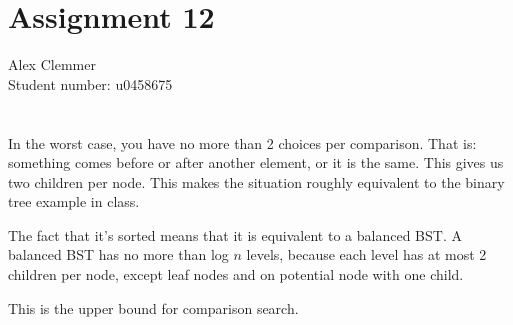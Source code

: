 \documentclass[a4paper]{article}
\begin{document}
\section*{Assignment 12}
Alex Clemmer\\
Student number: u0458675

\section{}

In the worst case, you have no more than 2 choices per comparison. That is: something comes before or after another element, or it is the same. This gives us two children per node. This makes the situation roughly equivalent to the binary tree example in class.

The fact that it's sorted means that it is equivalent to a balanced BST. A balanced BST has no more than log $n$ levels, because each level has at most 2 children per node, except leaf nodes and on potential node with one child.

This is the upper bound for comparison search.
\end{document}
